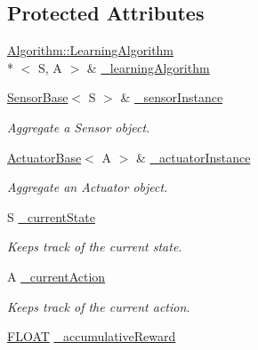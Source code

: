 \subsection*{Protected Attributes}
\begin{DoxyCompactItemize}
\item 
\hyperlink{classAI_1_1Algorithm_1_1LearningAlgorithm}{Algorithm\-::\-Learning\-Algorithm}\\*
$<$ S, A $>$ \& \hyperlink{classAI_1_1Agent_ae61529c109e21748dca77509b58f1f8e}{\-\_\-learning\-Algorithm}
\item 
\hypertarget{classAI_1_1Agent_a0f3b3a246bc3b2f8a833c628b3fa1b67}{\hyperlink{classAI_1_1SensorBase}{Sensor\-Base}$<$ S $>$ \& \hyperlink{classAI_1_1Agent_a0f3b3a246bc3b2f8a833c628b3fa1b67}{\-\_\-sensor\-Instance}}\label{classAI_1_1Agent_a0f3b3a246bc3b2f8a833c628b3fa1b67}

\begin{DoxyCompactList}\small\item\em Aggregate a Sensor object. \end{DoxyCompactList}\item 
\hypertarget{classAI_1_1Agent_af1cd837b1b9d626fee6bfc1b0cca4f33}{\hyperlink{classAI_1_1ActuatorBase}{Actuator\-Base}$<$ A $>$ \& \hyperlink{classAI_1_1Agent_af1cd837b1b9d626fee6bfc1b0cca4f33}{\-\_\-actuator\-Instance}}\label{classAI_1_1Agent_af1cd837b1b9d626fee6bfc1b0cca4f33}

\begin{DoxyCompactList}\small\item\em Aggregate an Actuator object. \end{DoxyCompactList}\item 
\hypertarget{classAI_1_1Agent_a3476836f8e24014e2d0e5bd3fcd06c4f}{S \hyperlink{classAI_1_1Agent_a3476836f8e24014e2d0e5bd3fcd06c4f}{\-\_\-current\-State}}\label{classAI_1_1Agent_a3476836f8e24014e2d0e5bd3fcd06c4f}

\begin{DoxyCompactList}\small\item\em Keeps track of the current state. \end{DoxyCompactList}\item 
\hypertarget{classAI_1_1Agent_a92741f4d9a5324c909e63ab330379411}{A \hyperlink{classAI_1_1Agent_a92741f4d9a5324c909e63ab330379411}{\-\_\-current\-Action}}\label{classAI_1_1Agent_a92741f4d9a5324c909e63ab330379411}

\begin{DoxyCompactList}\small\item\em Keeps track of the current action. \end{DoxyCompactList}\item 
\hyperlink{namespaceAI_a41b74884a20833db653dded3918e05c3}{F\-L\-O\-A\-T} \hyperlink{classAI_1_1Agent_aa4c5b41816bb39212727186a4af1afec}{\-\_\-accumulative\-Reward}
\end{DoxyCompactItemize}


